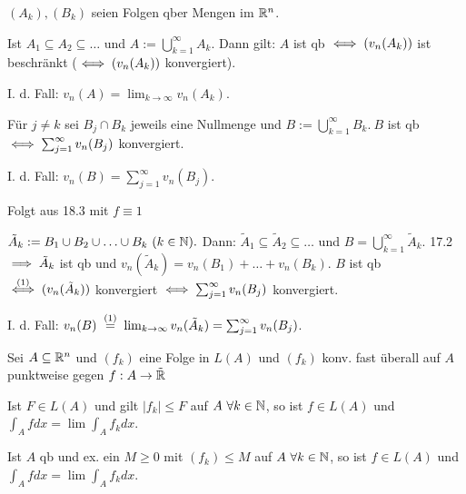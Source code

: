 \documentclass[a4paper,twoside,DIV15,BCOR12mm]{scrbook}
\begin{document}
\begin{satz}
$(A_k),(B_k)$ seien Folgen qber Mengen im $\mathbb{R}^n$.
\begin{liste}
\item Ist $A_1\subseteq A_2\subseteq \ldots$ und $A:=\bigcup_{k=1}^\infty A_k$. Dann gilt: $A$ ist qb $\iff (v_n(A_k))$ ist beschränkt ($\iff (v_n(A_k))$ konvergiert).

I. d. Fall: $v_n(A) = \lim_{k\to\infty}v_n(A_k)$.
\item Für $j\ne k$ sei $B_j\cap B_k$ jeweils eine Nullmenge und $B:=\bigcup_{k=1}^\infty B_k.\ B$ ist qb $\iff \sum_{j=1}^\infty v_n(B_j)$ konvergiert.

I. d. Fall: $v_n(B) = \sum_{j=1}^\infty v_n(B_j)$.
\end{liste}
\end{satz}

\begin{beweis}
\begin{liste}
\item Folgt aus 18.3 mit $f \equiv 1$
\item $\tilde A_k := B_1\cup B_2\cup\ldots\cup B_k\ (k\in\mathbb{N}).$ Dann: $\tilde A_1\subseteq \tilde A_2\subseteq \ldots$ und $B=\bigcup_{k=1}^\infty \tilde A_k.$ 17.2 $\implies \tilde A_k$ ist qb und $v_n(\tilde A_k) = v_n(B_1)+\ldots+v_n(B_k).$ $B$ ist qb $\overset{\text{(1)}}{\iff} (v_n(\tilde A_k))$ konvergiert $\iff \sum_{j=1}^\infty v_n(B_j)$ konvergiert.

I. d. Fall: $v_n(B) \gleichnach{(1)} \lim_{k\to\infty} v_n(\tilde A_k) = \sum_{j=1}^\infty v_n(B_j)$.
\end{liste}
\end{beweis}

\begin{satz}
Sei $A\subseteq\mathbb{R}^n$ und $(f_k)$ eine Folge in $L(A)$ und $(f_k)$ konv. fast überall auf $A$ punktweise gegen $f:A\to\tilde{\mathbb{R}}$
\begin{liste}
\item Ist $F\in L(A)$ und gilt $|f_k|\le F$ auf $A\ \forall k\in\mathbb{N}$, so ist $f\in L(A)$ und $\int_A fdx = \lim\int_A f_kdx$.

\item Ist $A$ qb und ex. ein $M\ge 0$ mit $(f_k)\le M$ auf $A\ \forall k\in\mathbb{N}$, so ist $f\in L(A)$ und $\int_A fdx = \lim\int_Af_kdx$.
\end{liste}
\end{satz}
\end{document}
